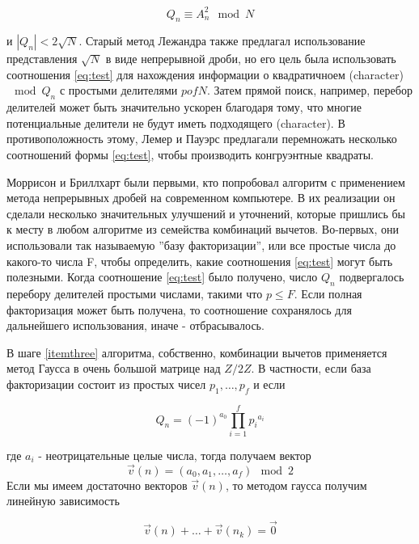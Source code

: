 \documentclass[a4paper,12pt]{report}
\begin{document}
\begin{equation}\label{eq:test}
Q_{n} \equiv A_{n}^{2} \mod N
\end{equation}


и $|Q_{n}| < 2\sqrt{N}$. Старый метод Лежандра также предлагал использование представления $\sqrt{N}$ в виде непрерывной дроби, но его цель была использовать соотношения \eqref{eq:test} для нахождения информации о квадратичноем (character) $\mod Q_{n}$ с простыми делителями $p of N$. Затем прямой поиск, например, перебор делителей может быть значительно ускорен благодаря тому, что многие потенциальные делители не будут иметь подходящего (character). В противоположность этому, Лемер и Пауэрс предлагали перемножать несколько соотношений формы \eqref{eq:test}, чтобы производить конгруэнтные квадраты.

Моррисон и Бриллхарт \cite{moris} были первыми, кто попробовал алгоритм с применением метода непрерывных дробей на современном компьютере. В их реализации он сделали несколько значительных улучшений и уточнений, которые пришлись бы к месту в любом алгоритме из семейства комбинаций вычетов. Во-первых, они использовали так называемую ''базу факторизации'', или все простые числа до какого-то числа F, чтобы определить, какие соотношения \eqref{eq:test} могут быть полезными. Когда соотношение \eqref{eq:test} было получено, число $Q_{n}$ подвергалось перебору делителей  простыми числами, такими что $p \leq F$. Если полная факторизация может быть получена, то соотношение сохранялось для дальнейшего использования, иначе - отбрасывалось.

В шаге \ref{itemthree} алгоритма, собственно, комбинации вычетов применяется метод Гаусса в очень большой матрице над $Z/2Z$. В частности, если база факторизации состоит из простых чисел $p_1, \ldots, p_f$ и если 

\begin{equation*}
Q_{n} = {(-1)}^{a_0} \prod_{i = 1}^{f} {p_i}^{a_i}
\end{equation*}  

где $a_i$ - неотрицательные целые числа, тогда получаем вектор 
\begin{equation*}
\vec{v}(n) = (a_0, a_1, \ldots, a_f) \mod 2
\end{equation*}
Если мы имеем достаточно векторов $\vec{v}(n)$, то методом гаусса получим линейную зависимость

\begin{equation*}
\vec{v}(n) + \ldots + \vec{v}(n_k) = \vec{0}
\end{equation*}
\end{document}
